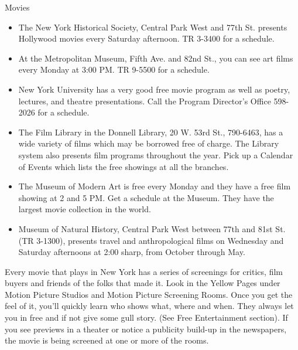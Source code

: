 \documentclass[11pt,twoside,a4paper]{book}
\begin{document}
Movies
\begin{itemize}
\item The New York Historical Society, Central Park West and 77th St. presents Hollywood movies every Saturday afternoon. TR 3-3400 for a schedule. 
\item At the Metropolitan Museum, Fifth Ave. and 82nd St., you can see art films every Monday at 3:00 PM. TR 9-5500 for a schedule. 
\item New York University has a very good free movie program as well as poetry, lectures, and theatre presentations. Call the Program Director's Office 598-2026 for a schedule. 
\item The Film Library in the Donnell Library, 20 W. 53rd St., 790-6463, has a wide variety of films which may be borrowed free of charge. The Library system also presents film programs throughout the year. Pick up a Calendar of Events which lists the free showings at all the branches. \item The Museum of Modern Art is free every Monday and they have a free film showing at 2 and 5 PM. Get a schedule at the Museum. They have the largest movie collection in the world. 
\item Museum of Natural History, Central Park West between 77th and 81st St. (TR 3-1300), presents travel and anthropological films on Wednesday and Saturday afternoons at 2:00 sharp, from October through May.
\end{itemize}
Every movie that plays in New York has a series of screenings for critics, film buyers and friends of the folks that made it. Look in the Yellow Pages under Motion Picture Studios and Motion Picture Screening Rooms. Once you get the feel of it, you'll quickly learn who shows what, where and when. They always let you in free and if not give some gull story. (See Free Entertainment section). If you see previews in a theater or notice a publicity build-up in the newspapers, the movie is being screened at one or more of the rooms.~\\
\end{document}
